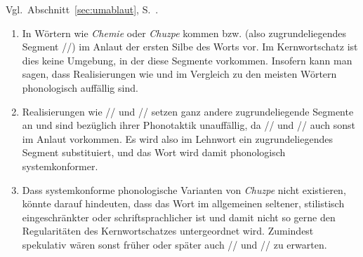 
Vgl.\ Abschnitt~\ref{sec:umablaut}, S.~\pageref{sec:umablaut}.


\begin{enumerate}\Lf
  \item In Wörtern wie \textit{Chemie} oder \textit{Chuzpe} kommen \textipa{[\c{c}]} bzw. \textipa{[X]} (also zugrundeliegendes Segment //) im Anlaut der ersten Silbe des Worts vor.
    Im Kernwortschatz ist dies keine Umgebung, in der diese Segmente vorkommen.
    Insofern kann man sagen, dass Realisierungen wie \textipa{[XU\t{ts}p@]} und \textipa{[\c{c}emi:]} im Vergleich zu den meisten Wörtern phonologisch auffällig sind.
  \item Realisierungen wie // und // setzen ganz andere zugrundeliegende Segmente an und sind bezüglich ihrer Phonotaktik unauffällig, da // und // auch sonst im Anlaut vorkommen.
    Es wird also im Lehnwort ein zugrundeliegendes Segment substituiert, und das Wort wird damit phonologisch systemkonformer.
  \item Dass systemkonforme phonologische Varianten von \textit{Chuzpe} nicht existieren, könnte darauf hindeuten, dass das Wort im allgemeinen seltener, stilistisch eingeschränkter oder schriftsprachlicher ist und damit nicht so gerne den Regularitäten des Kernwortschatzes untergeordnet wird.
    Zumindest spekulativ wären sonst früher oder später auch // und // zu erwarten.
\end{enumerate}



